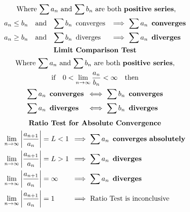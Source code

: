 \begin{center}
\begin{footnotesize}
\[\begin{gathered}
\begin{gathered}[t]
\text{
Where \({\small\sum}\,a_n\) and \({\small\sum}\,b_n\) are both \textbf{positive series},}\\
\begin{alignedat}{3}
  a_n &\le b_n
    &\quad\text{and}\quad&
  {\small\sum}\,b_n\,\text{ converges }
    &\enspace\implies\ &
  {\small\sum}\,a_n\enspace\mathbf{ converges }
\\
  a_n  &
  \ge b_n
    &\quad\text{and}\quad &
  {\small\sum}\,b_n\,\text{ diverges }
    &\enspace\implies\ &
  {\small\sum}\,a_n\enspace\mathbf{ diverges }
\end{alignedat}\end{gathered}
\\%
\begin{gathered}[t]\textbf{Limit Comparison Test}\\
\text{
Where \({\small\sum}\,a_n\) and \({\small\sum}\,b_n\) are both \textbf{positive series},
}\\
\text{if}\quad0 <\lim_{n\to\infty}\frac{a_n}{b_n}<\infty\quad\text{then}\\
\begin{alignedat}{2}&
  {\small\sum}\,a_n\enspace\mathbf{converges}
    &\enspace\iff\ &
  {\small\sum}\,b_n\enspace\mathbf{converges}
\\&
  {\small\sum}\,a_n\enspace\mathbf{diverges}
    &\enspace\iff\ &
  {\small\sum}\,b_n\enspace\mathbf{diverges}
\end{alignedat}\end{gathered}
\end{gathered}
\]
\pagebreak
\[
\begin{gathered}
\begin{gathered}[t]\textbf{Ratio Test for Absolute Convergence}\\
\begin{alignedat}{3}
  \lim_{n\to\infty}\left|\frac{a_{n+1}}{a_n}\right|&=L<1
    &\enspace\implies\ &
  {\small\sum}\,a_n\enspace\mathbf{converges\ absolutely}
\\
  \lim_{n\to\infty}\left|\frac{a_{n+1}}{a_n}\right|&=L>1
    &\enspace\implies\ &
  {\small\sum}\,a_n\enspace\mathbf{diverges}
\\
  \lim_{n\to\infty}\left|\frac{a_{n+1}}{a_n}\right|&=\infty
    &\enspace\implies\ &
  {\small\sum}\,a_n\enspace\mathbf{diverges}
\\
  \lim_{n\to\infty}\left|\frac{a_{n+1}}{a_n}\right|&=1
    &\enspace\implies\ &
  \text{Ratio Test is inconclusive}
\end{alignedat}\end{gathered}

\end{gathered}\]
\end{footnotesize}
\end{center}
